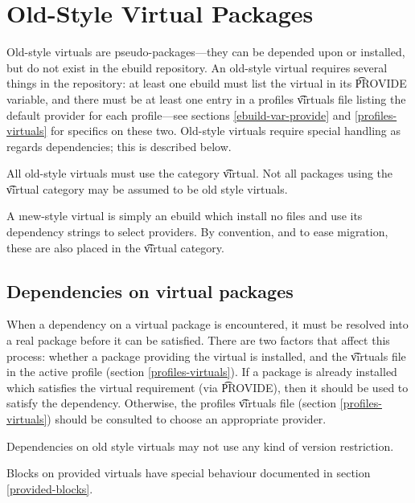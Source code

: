 \chapter{Old-Style Virtual Packages}
\label{old-virtuals}

Old-style virtuals are pseudo-packages---they can be depended upon or installed, but do not exist in
the ebuild repository.  An old-style virtual requires several things in the repository: at least one
ebuild must list the virtual in its \t{PROVIDE} variable, and there must be at least one entry in a
profiles \t{virtuals} file listing the default provider for each profile---see sections
\ref{ebuild-var-provide} and \ref{profiles-virtuals} for specifics on these two. Old-style virtuals
require special handling as regards dependencies; this is described below.

All old-style virtuals must use the category \t{virtual}. Not all packages using the \t{virtual}
category may be assumed to be old style virtuals.

\note A \i{new-style} virtual is simply an ebuild which install no files and use its dependency
strings to select providers. By convention, and to ease migration, these are also placed in the
\t{virtual} category.

\section{Dependencies on virtual packages}

When a dependency on a virtual package is encountered, it must be resolved into a real package
before it can be satisfied. There are two factors that affect this process: whether a package
providing the virtual is installed, and the \t{virtuals} file in the active profile (section
\ref{profiles-virtuals}). If a package is already installed which satisfies the virtual requirement
(via \t{PROVIDE}), then it should be used to satisfy the dependency. Otherwise, the profiles
\t{virtuals} file (section \ref{profiles-virtuals}) should be consulted to choose an appropriate
provider.

Dependencies on old style virtuals may not use any kind of version restriction.

Blocks on provided virtuals have special behaviour documented in section \ref{provided-blocks}.

